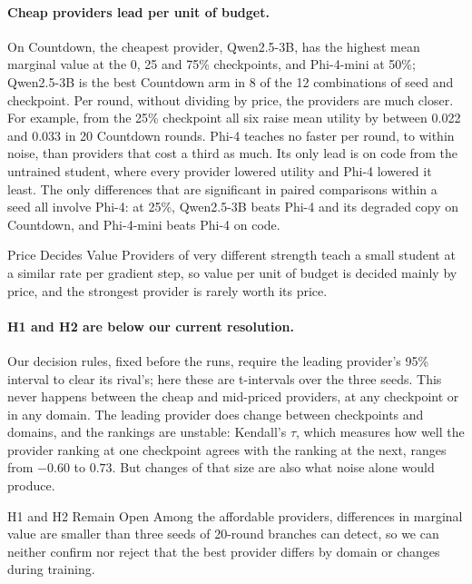 \paragraph{Cheap providers lead per unit of budget.} On Countdown, the cheapest provider,
Qwen2.5-3B, has the highest mean marginal value at the 0, 25 and 75\% checkpoints, and
Phi-4-mini at 50\%; Qwen2.5-3B is the best Countdown arm in 8 of the 12 combinations of seed
and checkpoint. Per round, without dividing by price, the providers are much closer. For
example, from the 25\% checkpoint all six raise mean utility by between 0.022 and 0.033 in
20 Countdown rounds. Phi-4 teaches no faster per round, to within noise, than providers that
cost a third as much. Its only lead is on code from the untrained student, where every
provider lowered utility and Phi-4 lowered it least. The only differences that are
significant in paired comparisons within a seed all involve Phi-4: at 25\%, Qwen2.5-3B beats
Phi-4 and its degraded copy on Countdown, and Phi-4-mini beats Phi-4 on code.

\begin{takeaway}{Price Decides Value}
\label{pre:tk:price}
Providers of very different strength teach a small student at a similar rate per gradient
step, so value per unit of budget is decided mainly by price, and the strongest provider is
rarely worth its price.
\end{takeaway}

\paragraph{H1 and H2 are below our current resolution.} Our decision rules, fixed before the
runs, require the leading provider's 95\% interval to clear its rival's; here these are
t-intervals over the three seeds. This never happens between the cheap and mid-priced
providers, at any checkpoint or in any domain. The leading provider does change between
checkpoints and domains, and the rankings are unstable: Kendall's $\tau$, which measures how
well the provider ranking at one checkpoint agrees with the ranking at the next, ranges from
$-0.60$ to $0.73$. But changes of that size are also what noise alone would produce.

\begin{takeaway}{H1 and H2 Remain Open}
\label{pre:tk:open}
Among the affordable providers, differences in marginal value are smaller than three seeds
of 20-round branches can detect, so we can neither confirm nor reject that the best
provider differs by domain or changes during training.
\end{takeaway}


